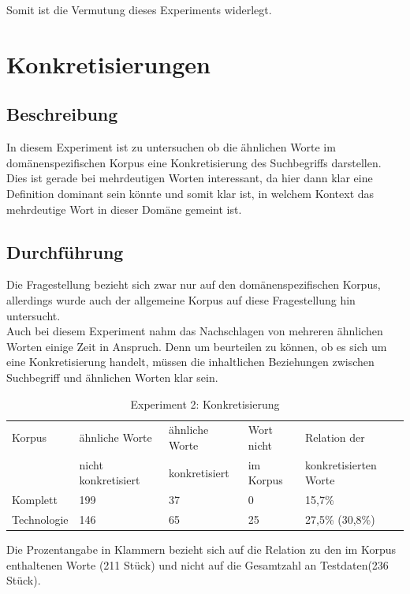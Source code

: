 \documentclass[12pt,a4paper]{report}
\begin{document}
		Somit ist die Vermutung dieses Experiments widerlegt.
		
		
	\newpage
	\section{Konkretisierungen}
		\subsection{Beschreibung}
		In diesem Experiment ist zu untersuchen ob die ähnlichen Worte im domänenspezifischen Korpus eine Konkretisierung des Suchbegriffs darstellen.\\
		Dies ist gerade bei mehrdeutigen Worten interessant, da hier dann klar eine Definition dominant sein könnte und somit klar ist, in welchem Kontext das mehrdeutige Wort in dieser Domäne gemeint ist.\\
		\subsection{Durchführung}
		Die Fragestellung bezieht sich zwar nur auf den domänenspezifischen Korpus, allerdings wurde auch der allgemeine Korpus auf diese Fragestellung hin untersucht.\\
		Auch bei diesem Experiment nahm das Nachschlagen von mehreren ähnlichen Worten einige Zeit in Anspruch. Denn um beurteilen zu können, ob es sich um eine Konkretisierung handelt, müssen die inhaltlichen Beziehungen zwischen Suchbegriff und ähnlichen Worten klar sein. \\
		
		
\begin{table}[h]
\caption{Experiment 2: Konkretisierung}
\begin{center}
\begin{tabular}{|l||l|l|l|l|}
\hline
Korpus & ähnliche Worte & ähnliche Worte  & Wort nicht  & Relation der\\
 & nicht konkretisiert & konkretisiert & im Korpus & konkretisierten Worte\\

\hline
 Komplett & 199 & 37 & 0 & 15,7\% \\
 \hline
 Technologie & 146 & 65 & 25 & 27,5\% (30,8\%)\\
 \hline
 
\end{tabular}
\end{center}
\end{table}
		Die Prozentangabe in Klammern bezieht sich auf die Relation zu den im Korpus enthaltenen Worte (211 Stück) und nicht auf die Gesamtzahl an Testdaten(236 Stück).\\
		
\end{document}
